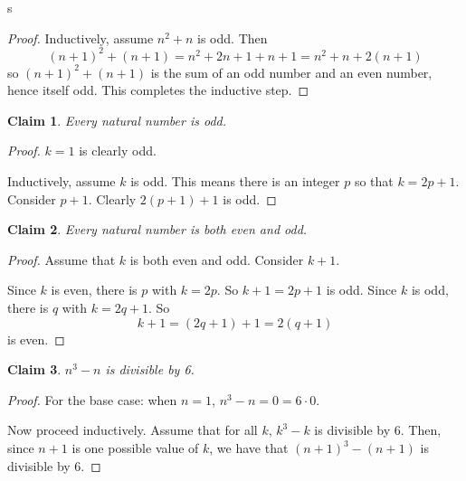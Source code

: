 s\documentclass[11pt]{letter}
\newtheorem{claim}{Claim}
\theoremstyle{definition}
\begin{document}
\begin{description}
\begin{enumerate}
\begin{proof}
					Inductively, assume $n^2+n$ is odd. Then
					$$(n+1)^2+(n+1)=n^2+2n+1+n+1=n^2+n+2(n+1)$$
					so $(n+1)^2+(n+1)$ is the sum of an odd number and an even number, hence itself odd. This completes the inductive step.
				\end{proof}
				
				\begin{claim}
					Every natural number is odd.
				\end{claim}
				\begin{proof}
					$k=1$ is clearly odd.
					
					Inductively, assume $k$ is odd. This means there is an integer $p$ so that $k=2p+1$. Consider $p+1$. Clearly $2(p+1)+1$ is odd.
				\end{proof}
				
				\begin{claim}
					Every natural number is both even and odd.
				\end{claim}
				\begin{proof}
					Assume that $k$ is both even and odd. Consider $k+1$.
					
					Since $k$ is even, there is $p$ with $k=2p$. So $k+1=2p+1$ is odd. Since $k$ is odd, there is $q$ with $k=2q+1$. So $$k+1=(2q+1)+1=2(q+1)$$is even.
				\end{proof}
				\begin{claim}
					$n^3-n$ is divisible by 6.
				\end{claim}
				\begin{proof}
					For the base case: when $n=1$, $n^3-n=0=6\cdot 0$.
					
					Now proceed inductively. Assume that for all $k$, $k^3-k$ is divisible by 6. Then, since $n+1$ is one possible value of $k$, we have that $(n+1)^3-(n+1)$ is divisible by 6. 
				\end{proof}


\end{enumerate}
\end{description}
\end{document}
